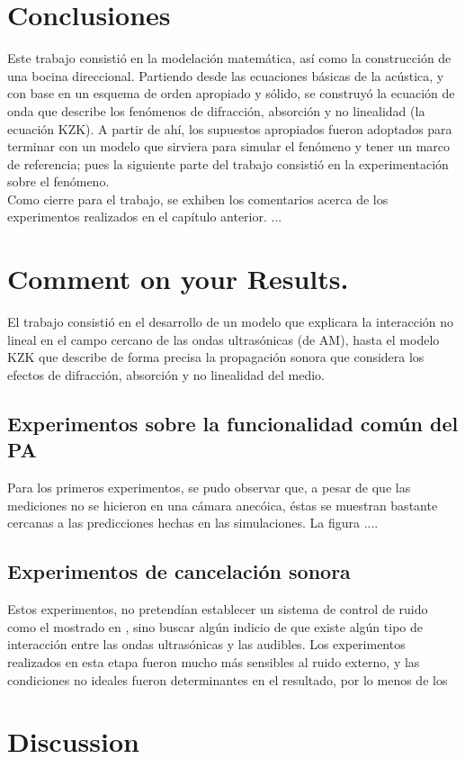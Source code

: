 \section{Conclusiones}
Este trabajo consistió en la modelación matemática, así como la
construcción de una bocina direccional. Partiendo desde las ecuaciones
básicas de la acústica, y con base en un esquema de orden apropiado y
sólido, se construyó la ecuación de onda que describe los fenómenos de
difracción, absorción y no linealidad (la ecuación KZK). A partir de
ahí, los supuestos apropiados fueron adoptados para terminar con un
modelo que sirviera para simular el fenómeno y tener un marco de
referencia; pues la siguiente parte
del trabajo consistió en la experimentación sobre el fenómeno.\medskip\\
Como cierre para el trabajo, se exhiben los comentarios acerca de los
experimentos realizados en el capítulo anterior. ...
\section{Comment on your Results.} 
El trabajo consistió en el desarrollo de un modelo que explicara la
interacción no lineal en el campo cercano de las ondas ultrasónicas
(de AM), hasta el modelo KZK que describe de forma precisa la
propagación sonora que considera los efectos de difracción, absorción
y no linealidad del medio.
\subsection{Experimentos sobre la funcionalidad común del PA}
Para los primeros experimentos, se pudo observar que, a pesar de que
las mediciones no se hicieron en una cámara anecóica, éstas se
muestran bastante cercanas a las predicciones hechas en las
simulaciones. La figura ....
\subsection{Experimentos de cancelación sonora}
Estos experimentos, no pretendían establecer un sistema de control de
ruido como el mostrado en \cite{feasibility}, sino buscar algún
indicio de que existe algún tipo de interacción entre las ondas
ultrasónicas y las audibles. Los experimentos realizados en esta etapa
fueron mucho más sensibles al ruido externo, y las condiciones no
ideales fueron determinantes en el resultado, por lo menos de los
\section{Discussion}
